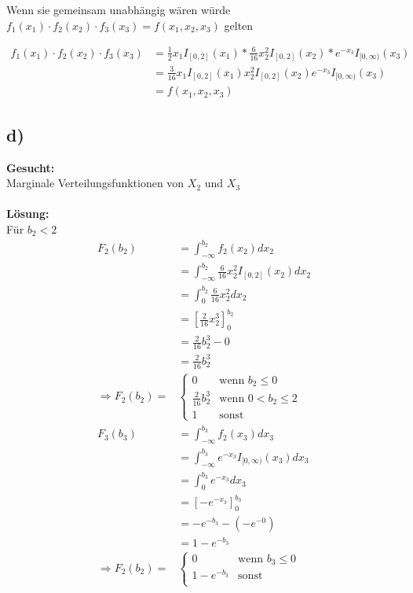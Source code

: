\documentclass{article}
\begin{document}
Wenn sie gemeinsam unabhängig wären würde $f_1(x_1) \cdot f_2(x_2) \cdot f_3(x_3) = f(x_1, x_2, x_3)$ gelten 

\begin{align*}
    f_1(x_1) \cdot f_2(x_2) \cdot f_3(x_3) &= \frac{1}{2}x_1 I_{[0,2]}(x_1) * \frac{6}{16} x_2^2 I_{[0,2]}(x_2) * e^{-x_3}I_{[0,\infty)}(x_3) \\
    &= \frac{3}{16}x_1 I_{[0,2]}(x_1)x_2^2 I_{[0,2]}(x_2)e^{-x_3}I_{[0,\infty)}(x_3) \\
    &= f(x_1, x_2, x_3)
\end{align*}

\subsection*{d)}
\textbf{Gesucht:} \\

Marginale Verteilungsfunktionen von $X_2$ und $X_3$\\ \\
\textbf{Lösung:} \\

Für $b_2 < 2$ 
\begin{align*}
    F_2(b_2) &= \int_{-\infty}^{b_2} f_2(x_2) dx_2 \\
    &= \int_{-\infty}^{b_2} \frac{6}{16} x_2^2 I_{[0,2]}(x_2) dx_2 \\
    &= \int_{0}^{b_2} \frac{6}{16} x_2^2 dx_2 \\
    &= \left[\frac{2}{16} x_2^3\right]_0^{b_2} \\ 
    &= \frac{2}{16} b_2^3 - 0 \\
    &= \frac{2}{16} b_2^3 \\ 
    \Longrightarrow F_2(b_2) = &\begin{cases}
        0 &\text{wenn } b_2 \leq 0 \\
        \frac{2}{16} b_2^3 &\text{wenn } 0 < b_2 \leq 2 \\
        1 &\text{sonst}
    \end{cases}\\
    F_3(b_3) &= \int_{-\infty}^{b_3} f_2(x_3) dx_3 \\
    &= \int_{-\infty}^{b_3} e^{-x_3} I_{[0,\infty)}(x_3) dx_3 \\
    &= \int_{0}^{b_3} e^{-x_3} dx_3 \\
    &= \left[-e^{-x_3}\right]_0^{b_3} \\
    &= -e^{-b_3} - (-e^{-0}) \\
    &= 1 - e^{-b_3} \\
    \Longrightarrow F_2(b_2) = &\begin{cases}
        0 &\text{wenn } b_3 \leq 0 \\
        1- e^{-b_3}&\text{sonst } \\
    \end{cases}\\
\end{align*}
\end{document}
